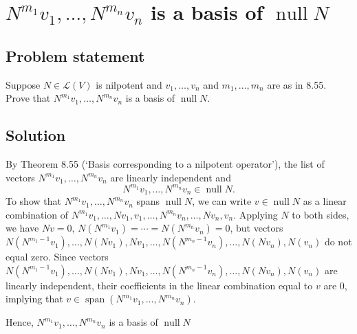 \documentclass{article}
\begin{document}
\clearpage

\section{$N^{m_1}v_1,\ldots,N^{m_n}v_n$ is a basis of $\operatorname{null}N$}
\subsection*{Problem statement}
Suppose $N\in\mathcal{L}(V)$ is nilpotent and $v_1,\ldots,v_n$ and $m_1,\ldots,m_n$ are as in 8.55. Prove that $N^{m_1}v_1,\ldots,N^{m_n}v_n$ is a basis of $\operatorname{null}N$.

\subsection*{Solution}
By Theorem 8.55 (`Basis corresponding to a nilpotent operator'), the list of vectors $N^{m_1}v_1,\ldots,N^{m_n}v_n$ are linearly independent and
\[N^{m_1}v_1,\ldots,N^{m_n}v_n\in\operatorname{null}N.\]
To show that $N^{m_1}v_1,\ldots,N^{m_n}v_n$ spans $\operatorname{null}N$, we can write $v\in\operatorname{null}N$ as a linear combination of $N^{m_1}v_1,\ldots,Nv_1,v_1,\ldots,N^{m_n}v_n,\ldots,Nv_n,v_n$. 
Applying $N$ to both sides, we have $Nv=0$, $N(N^{{m_1}}v_1)=\cdots=N(N^{{m_n}}v_n)=0$, but vectors $N(N^{{m_1-1}}v_1),\ldots,N(Nv_1),Nv_1,\ldots,N(N^{m_n-1}v_n),\ldots,N(Nv_n),N(v_n)$ do not equal zero. 
Since vectors \newline
$N(N^{{m_1-1}}v_1),\ldots,N(Nv_1),Nv_1,\ldots,N(N^{m_n-1}v_n),\ldots,N(Nv_n),N(v_n)$ are linearly independent, their coefficients in the linear combination equal to $v$ are $0$, implying that $v\in\operatorname{span}(N^{m_1}v_1,\ldots,N^{m_n}v_n)$.

Hence, $N^{m_1}v_1,\ldots,N^{m_n}v_n$ is a basis of $\operatorname{null}N$
\end{document}
